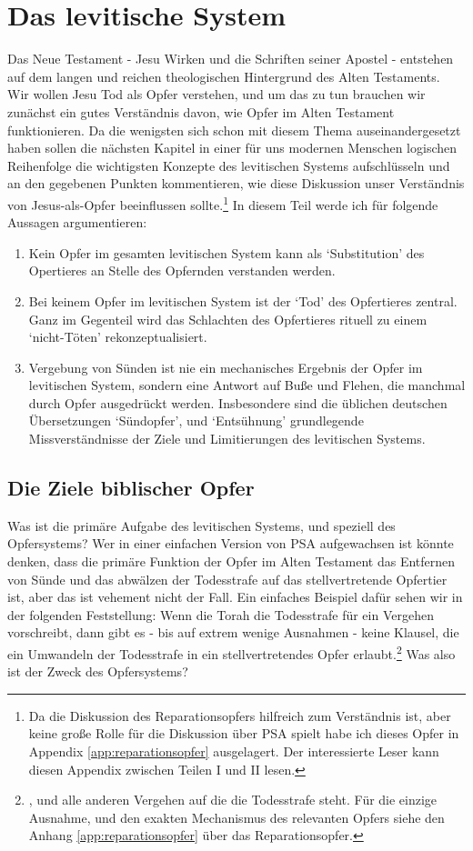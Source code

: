 \part{Das levitische System}
Das Neue Testament - Jesu Wirken und die Schriften seiner Apostel - entstehen auf dem langen und reichen theologischen Hintergrund des
Alten Testaments.
Wir wollen Jesu Tod als Opfer verstehen, und um das zu tun brauchen wir zunächst ein gutes Verständnis davon,
wie Opfer im Alten Testament funktionieren.
Da die wenigsten sich schon mit diesem Thema auseinandergesetzt haben sollen die nächsten Kapitel in einer für uns modernen Menschen
logischen Reihenfolge die wichtigsten Konzepte des levitischen Systems aufschlüsseln und an den gegebenen Punkten kommentieren,
wie diese Diskussion unser Verständnis von Jesus-als-Opfer beeinflussen sollte.\footnote{
Da die Diskussion des Reparationsopfers hilfreich zum Verständnis ist, aber keine große Rolle für die Diskussion über PSA spielt habe ich dieses Opfer in Appendix \ref{app:reparationsopfer} ausgelagert.
Der interessierte Leser kann diesen Appendix zwischen Teilen I und II lesen.}
In diesem Teil werde ich für folgende Aussagen argumentieren:
\begin{enumerate}[(1)]
\item Kein Opfer im gesamten levitischen System kann als `Substitution' des Opertieres an Stelle des Opfernden verstanden werden.
\item Bei keinem Opfer im levitischen System ist der `Tod' des Opfertieres zentral.
	Ganz im Gegenteil wird das Schlachten des Opfertieres rituell zu einem `nicht-Töten' rekonzeptualisiert.
\item Vergebung von Sünden ist nie ein mechanisches Ergebnis der Opfer im levitischen System, sondern eine Antwort auf Buße und Flehen, die manchmal durch Opfer ausgedrückt werden.
 Insbesondere sind die üblichen deutschen Übersetzungen `Sündopfer', und `Entsühnung' grundlegende Missverständnisse der Ziele und Limitierungen des levitischen Systems.
\end{enumerate}


\chapter{Die Ziele biblischer Opfer}
Was ist die primäre Aufgabe des levitischen Systems, und speziell des Opfersystems?
Wer in einer einfachen Version von PSA aufgewachsen ist könnte denken, dass die primäre Funktion der Opfer im Alten Testament das Entfernen von Sünde
und das abwälzen der Todesstrafe auf das stellvertretende Opfertier ist, aber das ist vehement nicht der Fall.
Ein einfaches Beispiel dafür sehen wir in der folgenden Feststellung:
Wenn die Torah die Todesstrafe für ein Vergehen vorschreibt, dann gibt es - bis auf extrem wenige Ausnahmen - keine Klausel, die ein Umwandeln der Todesstrafe in ein stellvertretendes
Opfer erlaubt.\footnote{
,  und alle anderen Vergehen auf die die Todesstrafe steht.
Für die einzige Ausnahme, und den exakten Mechanismus des relevanten Opfers siehe den Anhang \ref{app:reparationsopfer} über das Reparationsopfer.
}
Was also ist der Zweck des Opfersystems?

